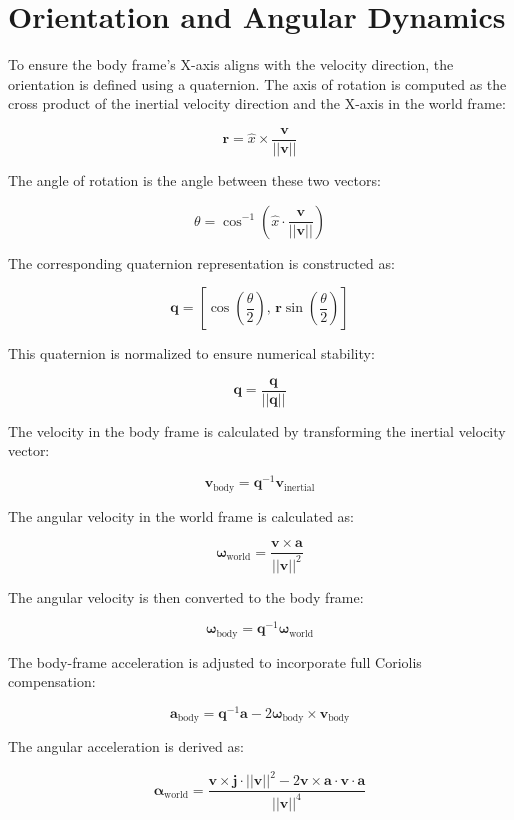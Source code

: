 \documentclass{article}
\begin{document}
	\section{Orientation and Angular Dynamics}

	To ensure the body frame’s X-axis aligns with the velocity direction, the orientation is defined using a quaternion. The axis of rotation is computed as the cross product of the inertial velocity direction and the X-axis in the world frame:

	\[
	\mathbf{r} = \hat{x} \times \frac{\mathbf{v}}{||\mathbf{v}||}
	\]

	The angle of rotation is the angle between these two vectors:

	\[
	\theta = \cos^{-1}\left( \hat{x} \cdot \frac{\mathbf{v}}{||\mathbf{v}||} \right)
	\]

	The corresponding quaternion representation is constructed as:

	\[
	\mathbf{q} = \left[\cos\left(\frac{\theta}{2}\right),\, \mathbf{r} \sin\left(\frac{\theta}{2}\right)\right]
	\]

	This quaternion is normalized to ensure numerical stability:

	\[\mathbf{q} = \frac{\mathbf{q}}{||\mathbf{q}||}\]

	The velocity in the body frame is calculated by transforming the inertial velocity vector:

	\[\mathbf{v}_{\text{body}} = \mathbf{q}^{-1} \mathbf{v}_{\text{inertial}}\]

	The angular velocity in the world frame is calculated as:

	\[
	\boldsymbol{\omega}_{\text{world}} = \frac{\mathbf{v} \times \mathbf{a}}{||\mathbf{v}||^2}
	\]

	The angular velocity is then converted to the body frame:

	\[\boldsymbol{\omega}_{\text{body}} = \mathbf{q}^{-1} \boldsymbol{\omega}_{\text{world}}\]

	The body-frame acceleration is adjusted to incorporate full Coriolis compensation:

	\[
	\mathbf{a}_{\text{body}} = \mathbf{q}^{-1} \mathbf{a} - 2 \boldsymbol{\omega}_{\text{body}} \times \mathbf{v}_{\text{body}}
	\]

	The angular acceleration is derived as:

	\[
	\boldsymbol{\alpha}_{\text{world}} = \frac{\mathbf{v} \times \mathbf{j} \cdot ||\mathbf{v}||^2 - 2\mathbf{v} \times \mathbf{a} \cdot \mathbf{v} \cdot \mathbf{a}}{||\mathbf{v}||^4}
	\]
\end{document}
